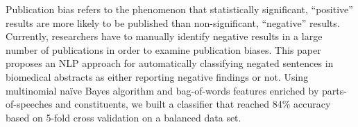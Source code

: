 Publication bias refers to the phenomenon that statistically significant, ``positive'' results are more likely to be published than non-significant, ``negative'' results. Currently, researchers have to manually identify negative results in a large number of publications in order to examine publication biases. This paper proposes an NLP approach for automatically classifying negated sentences in biomedical abstracts as either reporting negative findings or not. Using multinomial naïve Bayes algorithm and bag-of-words features enriched by parts-of-speeches and constituents, we built a classifier that reached 84\% accuracy based on 5-fold cross validation on a balanced data set.

